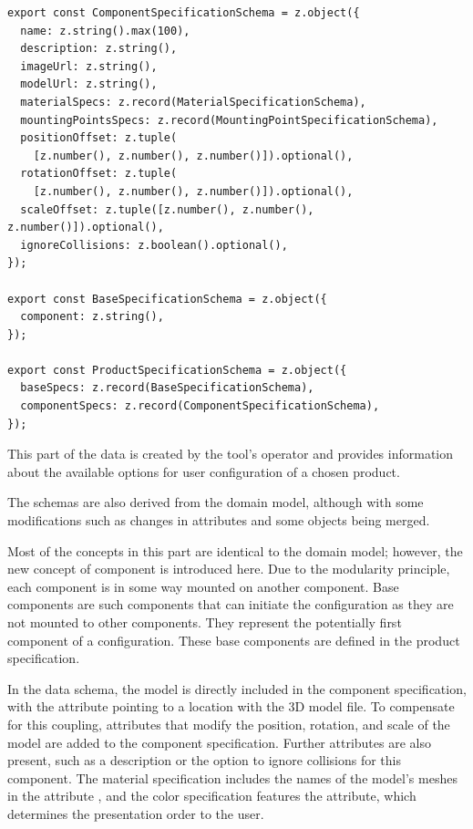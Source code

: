 \begin{lstlisting}[caption={~Product and component specification schema},label={lst:schema-componentspecification},captionpos=b,abovecaptionskip=\medskipamount,belowcaptionskip=\medskipamount]
export const ComponentSpecificationSchema = z.object({
  name: z.string().max(100),
  description: z.string(),
  imageUrl: z.string(),
  modelUrl: z.string(),
  materialSpecs: z.record(MaterialSpecificationSchema),
  mountingPointsSpecs: z.record(MountingPointSpecificationSchema),
  positionOffset: z.tuple(
    [z.number(), z.number(), z.number()]).optional(),
  rotationOffset: z.tuple(
    [z.number(), z.number(), z.number()]).optional(),
  scaleOffset: z.tuple([z.number(), z.number(), z.number()]).optional(),
  ignoreCollisions: z.boolean().optional(),
});

export const BaseSpecificationSchema = z.object({
  component: z.string(),
});

export const ProductSpecificationSchema = z.object({
  baseSpecs: z.record(BaseSpecificationSchema),
  componentSpecs: z.record(ComponentSpecificationSchema),
});
\end{lstlisting}

This part of the data is created by the tool's operator and provides information about the available options for user configuration of a chosen product.

The schemas are also derived from the domain model, although with some modifications such as changes in attributes and some objects being merged.

Most of the concepts in this part are identical to the domain model; however, the new concept of  component is introduced here. Due to the modularity principle, each component is in some way mounted on another component. Base components are such components that can initiate the configuration as they are not mounted to other components. They represent the potentially first component of a configuration. These base components are defined in the product specification.

In the data schema, the model is directly included in the component specification, with the  attribute pointing to a location with the 3D model file. To compensate for this coupling, attributes that modify the position, rotation, and scale of the model are added to the component specification. Further attributes are also present, such as a description or the option to ignore collisions for this component. The material specification includes the names of the model's meshes in the attribute , and the color specification features the  attribute, which determines the presentation order to the user.

